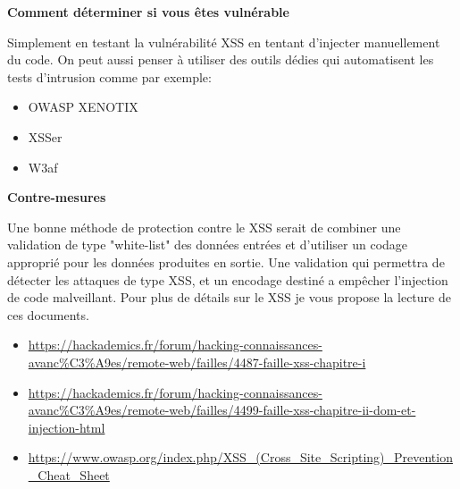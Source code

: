 \bigskip

\begin{flushleft}
\textbf{Comment déterminer si vous êtes vulnérable}

\smallskip

Simplement en testant la vulnérabilité XSS en tentant d'injecter manuellement du code. On peut aussi penser à utiliser des outils dédies qui automatisent les tests d'intrusion comme par exemple:
\end{flushleft}

\bigskip

\begin{itemize}
\item OWASP XENOTIX
\item XSSer
\item W3af
\end{itemize}

\bigskip

\begin{flushleft}
\textbf{Contre-mesures}

\smallskip

Une bonne méthode de protection contre le XSS serait de combiner une validation de type "white-list" des données entrées et d'utiliser un codage approprié pour les données produites en sortie. Une validation qui permettra de détecter les attaques de type XSS, et un encodage destiné a empêcher l'injection de code malveillant. Pour plus de détails sur le XSS je vous propose la lecture de ces documents.
\end{flushleft}

\bigskip

\begin{itemize}
\item \url{https://hackademics.fr/forum/hacking-connaissances-avanc%C3%A9es/remote-web/failles/4487-faille-xss-chapitre-i}\\

\item \url{https://hackademics.fr/forum/hacking-connaissances-avanc%C3%A9es/remote-web/failles/4499-faille-xss-chapitre-ii-dom-et-injection-html}\\

\item \url{https://www.owasp.org/index.php/XSS_(Cross_Site_Scripting)_Prevention_Cheat_Sheet}
\end{itemize}

\endinput
